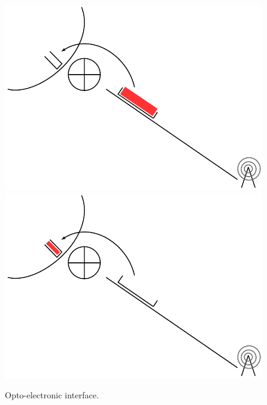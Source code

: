 \documentclass[a4paper,10pt,english]{article}
\begin{document}
\begin{figure}[h!]
\begin{center}   

      \includegraphics[scale=0.3]{slot1.pdf}
  \includegraphics[scale=0.3]{slot2.pdf}
     \caption{Opto-electronic interface.}
     
\end{center}
  \end{figure}
  
\end{document}

